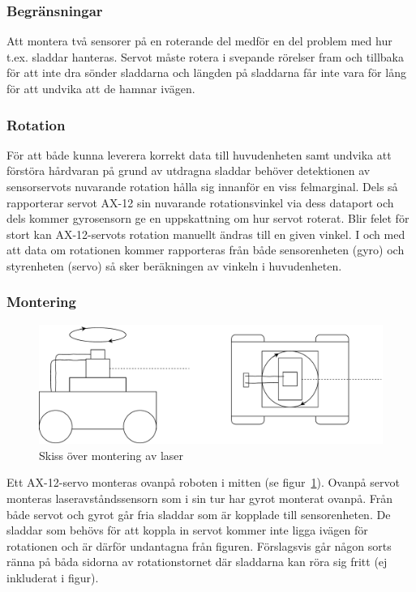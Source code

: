 \documentclass{article}
\begin{document}
\subsubsection{Begränsningar}
Att montera två sensorer på en roterande del medför en del problem med hur t.ex. sladdar hanteras. Servot måste rotera i svepande rörelser fram och tillbaka för att inte dra sönder sladdarna och längden på sladdarna får inte vara för lång för att undvika att de hamnar ivägen.

\subsubsection{Rotation}
För att både kunna leverera korrekt data till huvudenheten samt undvika att förstöra hårdvaran på grund av utdragna sladdar behöver detektionen av sensorservots nuvarande rotation hålla sig innanför en viss felmarginal. Dels så rapporterar servot AX-12 sin nuvarande rotationsvinkel via dess dataport och dels kommer gyrosensorn ge en uppskattning om hur servot roterat. Blir felet för stort kan AX-12-servots rotation manuellt ändras till en given vinkel. I och med att data om rotationen kommer rapporteras från både sensorenheten (gyro) och styrenheten (servo) så sker beräkningen av vinkeln i huvudenheten.

\subsubsection{Montering}
\begin{figure}[H]
\centering
\includegraphics[scale=0.45]{Montering}
\caption{Skiss över montering av laser}
\label{fig:montering}
\end{figure}
Ett AX-12-servo monteras ovanpå roboten i mitten (se figur~\ref{fig:montering}). Ovanpå servot monteras laseravståndssensorn som i sin tur har gyrot monterat ovanpå. Från både servot och gyrot går fria sladdar som är kopplade till sensorenheten. De sladdar som behövs för att koppla in servot kommer inte ligga ivägen för rotationen och är därför undantagna från figuren. Förslagsvis går någon sorts ränna på båda sidorna av rotationstornet där sladdarna kan röra sig fritt (ej inkluderat i figur).
\end{document}
